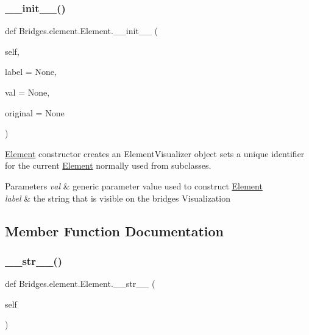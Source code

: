 \subsubsection{\texorpdfstring{\+\_\+\+\_\+init\+\_\+\+\_\+()}{\_\_init\_\_()}}
{\footnotesize\ttfamily def Bridges.\+element.\+Element.\+\_\+\+\_\+init\+\_\+\+\_\+ (\begin{DoxyParamCaption}\item[{}]{self,  }\item[{}]{label = {\ttfamily None},  }\item[{}]{val = {\ttfamily None},  }\item[{}]{original = {\ttfamily None} }\end{DoxyParamCaption})}



\mbox{\hyperlink{class_bridges_1_1element_1_1_element}{Element}} constructor creates an Element\+Visualizer object sets a unique identifier for the current \mbox{\hyperlink{class_bridges_1_1element_1_1_element}{Element}} normally used from subclasses. 


\begin{DoxyParams}{Parameters}
{\em val} & generic parameter value used to construct \mbox{\hyperlink{class_bridges_1_1element_1_1_element}{Element}} \\
\hline
{\em label} & the string that is visible on the bridges Visualization \\
\hline
\end{DoxyParams}


\subsection{Member Function Documentation}
\mbox{\label{class_bridges_1_1element_1_1_element_affacf899ae3b7215323848cde7583a2c}} 
\subsubsection{\texorpdfstring{\+\_\+\+\_\+str\+\_\+\+\_\+()}{\_\_str\_\_()}}
{\footnotesize\ttfamily def Bridges.\+element.\+Element.\+\_\+\+\_\+str\+\_\+\+\_\+ (\begin{DoxyParamCaption}\item[{}]{self }\end{DoxyParamCaption})}

